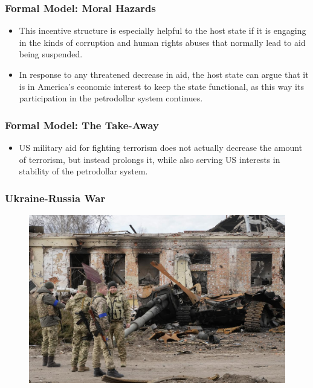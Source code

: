 \documentclass[handout]{beamer}
\begin{document}
\begin{frame} 
	\frametitle{\LARGE{Formal Model: Moral Hazards}}
	\begin{itemize}
		\item This incentive structure is especially helpful to the host state if it is engaging in the kinds of corruption and human rights abuses that normally lead to aid being suspended. \pause
		\item In response to any threatened decrease in aid, the host state can argue that it is in America's economic interest to keep the state functional, as this way its participation in the petrodollar system continues. 
	\end{itemize}
\end{frame}

\begin{frame} 
	\frametitle{\LARGE{Formal Model: The Take-Away}}
	\begin{itemize}
		\item US military aid for fighting terrorism does not actually decrease the amount of terrorism, but instead prolongs it, while also serving US interests in stability of the petrodollar system.
	\end{itemize}
\end{frame}

\begin{frame} 
	\frametitle{\LARGE{Ukraine-Russia War}}
	\begin{figure}[ht!]
		\centering
		\includegraphics[width=\textwidth,height=0.9\textheight,keepaspectratio]{Russia_Ukraine_War_33204.jpg-795e2.jpg}
	\end{figure}
\end{frame}
\end{document}
